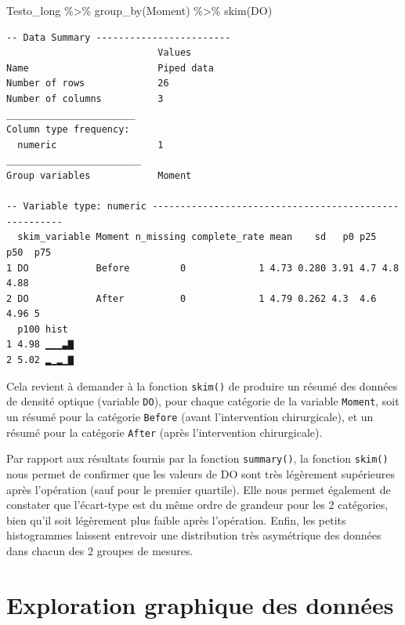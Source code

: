 \documentclass[
  a4paper,
  DIV=11,
  numbers=noendperiod,
  oneside]{scrreprt}
\newenvironment{Shaded}{}{}
\newcommand{\FunctionTok}[1]{\textcolor[rgb]{0.44,0.26,0.76}{#1}}
\newcommand{\NormalTok}[1]{\textcolor[rgb]{0.14,0.16,0.18}{#1}}
\newcommand{\SpecialCharTok}[1]{\textcolor[rgb]{0.00,0.36,0.77}{#1}}
\begin{document}
\begin{Shaded}
\begin{Highlighting}[]
\NormalTok{Testo\_long }\SpecialCharTok{\%\textgreater{}\%}
  \FunctionTok{group\_by}\NormalTok{(Moment) }\SpecialCharTok{\%\textgreater{}\%}
  \FunctionTok{skim}\NormalTok{(DO)}
\end{Highlighting}
\end{Shaded}

\begin{verbatim}
-- Data Summary ------------------------
                           Values    
Name                       Piped data
Number of rows             26        
Number of columns          3         
_______________________              
Column type frequency:               
  numeric                  1         
________________________             
Group variables            Moment    

-- Variable type: numeric ------------------------------------------------------
  skim_variable Moment n_missing complete_rate mean    sd   p0 p25  p50  p75
1 DO            Before         0             1 4.73 0.280 3.91 4.7 4.8  4.88
2 DO            After          0             1 4.79 0.262 4.3  4.6 4.96 5   
  p100 hist 
1 4.98 ▁▁▁▃▇
2 5.02 ▂▁▂▁▇
\end{verbatim}

Cela revient à demander à la fonction \texttt{skim()} de produire un
résumé des données de densité optique (variable \texttt{DO}), pour
chaque catégorie de la variable \texttt{Moment}, soit un résumé pour la
catégorie \texttt{Before} (avant l'intervention chirurgicale), et un
résumé pour la catégorie \texttt{After} (après l'intervention
chirurgicale).

Par rapport aux résultats fournis par la fonction \texttt{summary()}, la
fonction \texttt{skim()} nous permet de confirmer que les valeurs de DO
sont très légèrement supérieures après l'opération (sauf pour le premier
quartile). Elle nous permet également de constater que l'écart-type est
du même ordre de grandeur pour les 2 catégories, bien qu'il soit
légèrement plus faible après l'opération. Enfin, les petits histogrammes
laissent entrevoir une distribution très asymétrique des données dans
chacun des 2 groupes de mesures.

\hypertarget{exploration-graphique-des-donnuxe9es}{%
\section{Exploration graphique des
données}\label{exploration-graphique-des-donnuxe9es}}
\end{document}

